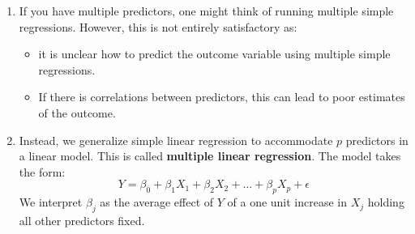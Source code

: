 \documentclass[10pt]{article}
\newcommand{\eps}{\epsilon}
\begin{document}
\begin{enumerate}
	\item If you have multiple predictors, one might think of running multiple simple regressions.  However, this is not entirely satisfactory as:
	\begin{itemize}
		\item it is unclear how to predict the outcome variable using multiple simple regressions.
		\item If there is correlations between predictors, this can lead to poor estimates of the outcome.
	\end{itemize}
	\item Instead, we generalize simple linear regression to accommodate $p$ predictors in a linear model.  This is called \textbf{multiple linear regression}. The model takes the form:
	$$ Y = \beta_0 + \beta_1 X_1 + \beta_2X_2 + \dots + \beta_pX_p + \eps$$
	We interpret $\beta_j$ as the average effect of $Y$ of a one unit increase in $X_j$ holding all other predictors fixed.
\end{enumerate}

\vspace{.2in} 
\end{document}
